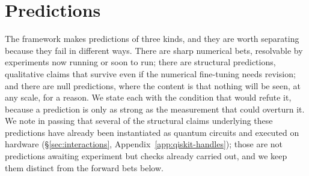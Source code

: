 %
%
%
%

\section{Predictions}
\label{sec:predictions}

The framework makes predictions of three kinds, and they are worth separating because they fail in
different ways. There are sharp numerical bets, resolvable by experiments now running or soon to run;
there are structural predictions, qualitative claims that survive even if the numerical fine-tuning
needs revision; and there are null predictions, where the content is that nothing will be seen, at any
scale, for a reason. We state each with the condition that would refute it, because a prediction is
only as strong as the measurement that could overturn it. We note in passing that several of the
structural claims underlying these predictions have already been instantiated as quantum circuits and
executed on hardware (\S\ref{sec:interactions}, Appendix~\ref{app:qiskit-handles}); those are not
predictions awaiting experiment but checks already carried out, and we keep them distinct from the
forward bets below.

